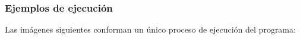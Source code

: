 \documentclass[a4paper,12pt]{article}
\begin{document}
\subsubsection{Ejemplos de ejecución}
Las imágenes siguientes conforman un único proceso de ejecución del programa:
\begin{figure}[h]
  \centering
\end{figure}
\begin{figure}[h]
  \centering
\end{figure}
\begin{figure}[h]
  \centering
\end{figure}
\begin{figure}[h]
  \centering
\end{figure}
\begin{figure}[h]
  \centering
\end{figure}
\clearpage
\end{document}
